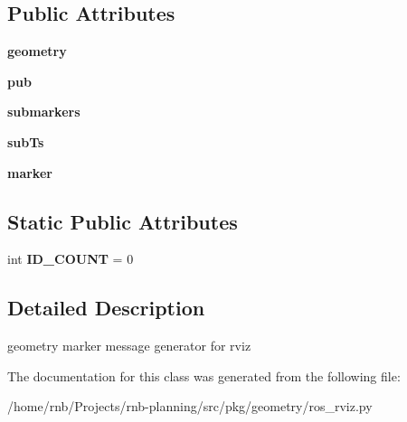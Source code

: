 \subsection*{Public Attributes}
\begin{DoxyCompactItemize}
\item 
\mbox{\label{classrnb-planning_1_1src_1_1pkg_1_1geometry_1_1ros__rviz_1_1_geo_marker_af5958ea45242b56764959a9b7303b71e}} 
{\bfseries geometry}
\item 
\mbox{\label{classrnb-planning_1_1src_1_1pkg_1_1geometry_1_1ros__rviz_1_1_geo_marker_a14a1362f80402c829bac253e58ffb5ad}} 
{\bfseries pub}
\item 
\mbox{\label{classrnb-planning_1_1src_1_1pkg_1_1geometry_1_1ros__rviz_1_1_geo_marker_a85a69e30d7b8bb47df5aec0b7ad793e9}} 
{\bfseries submarkers}
\item 
\mbox{\label{classrnb-planning_1_1src_1_1pkg_1_1geometry_1_1ros__rviz_1_1_geo_marker_a7ae9dd10bfaf1b170f514a4a2fab5dd8}} 
{\bfseries sub\+Ts}
\item 
\mbox{\label{classrnb-planning_1_1src_1_1pkg_1_1geometry_1_1ros__rviz_1_1_geo_marker_aeb82e6c31518ebdd2a0f274d385ca9f7}} 
{\bfseries marker}
\end{DoxyCompactItemize}
\subsection*{Static Public Attributes}
\begin{DoxyCompactItemize}
\item 
\mbox{\label{classrnb-planning_1_1src_1_1pkg_1_1geometry_1_1ros__rviz_1_1_geo_marker_aad27464348627680881421eefd7081d2}} 
int {\bfseries I\+D\+\_\+\+C\+O\+U\+NT} = 0
\end{DoxyCompactItemize}


\subsection{Detailed Description}
geometry marker message generator for rviz 

The documentation for this class was generated from the following file\+:\begin{DoxyCompactItemize}
\item 
/home/rnb/\+Projects/rnb-\/planning/src/pkg/geometry/ros\+\_\+rviz.\+py\end{DoxyCompactItemize}
